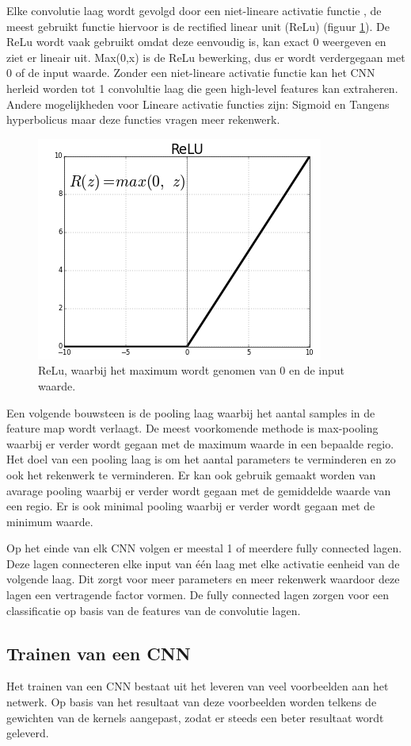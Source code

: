 Elke convolutie laag wordt gevolgd door een niet-lineare activatie functie %
, de meest gebruikt functie hiervoor is de rectified linear unit (ReLu) (figuur \ref{fig:relu}). 
De ReLu wordt vaak gebruikt omdat deze eenvoudig is, kan exact 0 weergeven en ziet er lineair uit. 
Max(0,x) is de ReLu bewerking, dus er wordt verdergegaan met 0 of de input waarde. 
Zonder een niet-lineare activatie functie kan het CNN herleid worden tot 1 convolultie laag die geen high-level features kan extraheren. 
Andere mogelijkheden voor Lineare activatie functies zijn: Sigmoid en Tangens hyperbolicus maar deze functies vragen meer rekenwerk.

\begin{figure}[!ht]
 	\centering
 	\includegraphics[width=0.35\linewidth]{fig/ReLu.png}
 	\caption{ReLu, waarbij het maximum wordt genomen van 0 en de input waarde.}
 	\label{fig:relu}
\end{figure}

Een volgende bouwsteen is de pooling laag waarbij het aantal samples in de feature map wordt verlaagt. 
De meest voorkomende methode is max-pooling waarbij er verder wordt gegaan met de maximum waarde in een bepaalde regio. 
Het doel van een pooling laag is om het aantal parameters te verminderen en zo ook het rekenwerk te verminderen. 
Er kan ook gebruik gemaakt worden van avarage pooling waarbij er verder wordt gegaan met de gemiddelde waarde van een regio. 
Er is ook minimal pooling waarbij er verder wordt gegaan met de minimum waarde.

Op het einde van elk CNN volgen er meestal 1 of meerdere fully connected lagen. 
Deze lagen connecteren elke input van \'e\'en laag met elke activatie eenheid van de volgende laag. 
Dit zorgt voor meer parameters en meer rekenwerk waardoor deze lagen een vertragende factor vormen. 
De fully connected lagen zorgen voor een classificatie op basis van de features van de convolutie lagen.

\subsection{Trainen van een CNN}
Het trainen van een CNN bestaat uit het leveren van veel voorbeelden aan het netwerk. 
Op basis van het resultaat van deze voorbeelden worden telkens de gewichten van de kernels aangepast, zodat er steeds een beter resultaat wordt geleverd. 

